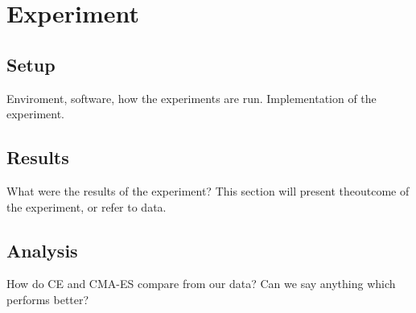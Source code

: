 \section{Experiment}

\subsection{Setup}

Enviroment, software, how the experiments are run.
Implementation of the experiment.

\subsection{Results}

What were the results of the experiment? This section will
present theoutcome of the experiment, or refer to data.

\subsection{Analysis}

How do CE and CMA-ES compare from our data? Can we say anything 
which performs better?

